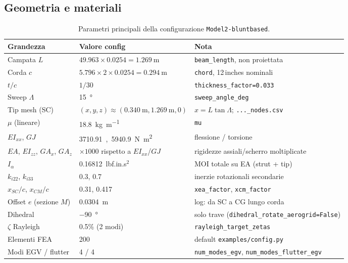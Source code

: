 \documentclass[11pt,a4paper]{article}
\begin{document}
\subsection{Geometria e materiali}

\begin{table}[H]
  \centering
  \caption{Parametri principali della configurazione \texttt{Model2-bluntbased}.}
  \label{tab:config}
  \begin{tabular}{lll}
    \toprule
    Grandezza & Valore config & Nota \\
    \midrule
    Campata $L$ & $49.963\times0.0254 = \SI{1.269}{\meter}$ & \texttt{beam\_length}, non proiettata \\
    Corda $c$ & $5.796\times2\times0.0254 = \SI{0.294}{\meter}$ & \texttt{chord}, 12\,inches nominali \\
    $t/c$ & $1/30$ & \texttt{thickness\_factor=0.033} \\
    Sweep $\Lambda$ & \SI{15}{\degree} & \texttt{sweep\_angle\_deg} \\
    Tip mesh (SC) & $(x,y,z)\approx(\SI{0.340}{\meter},\SI{1.269}{\meter},0)$ & $x=L\tan\Lambda$; \texttt{...\_nodes.csv} \\
    $\mu$ (lineare) & \SI{18.8}{\kilogram\per\meter} & \texttt{mu} \\
    $EI_{xx}$, $GJ$ & \SI{3710.91}, \SI{5940.9}{\newton\meter\squared} & flessione / torsione \\
    $EA$, $EI_{zz}$, $GA_x$, $GA_z$ & $\times 1000$ rispetto a $EI_{xx}$/$GJ$ & rigidezze assiali/scherro moltiplicate \\
    $I_\alpha$ & \SI{0.16812}{lbf.in.s$^2$} & MOI totale su EA (strut + tip) \\
    $k_{i22}$, $k_{i33}$ & 0.3, 0.7 & inerzie rotazionali secondarie \\
    $x_{SC}/c$, $x_{CM}/c$ & 0.31, 0.417 & \texttt{xea\_factor}, \texttt{xcm\_factor} \\
    Offset $e$ (sezione $M$) & \SI{0.0304}{\meter} & log: da SC a CG lungo corda \\
    Dihedral & \SI{-90}{\degree} & solo trave (\texttt{dihedral\_rotate\_aerogrid=False}) \\
    $\zeta$ Rayleigh & 0.5\% (2 modi) & \texttt{rayleigh\_target\_zetas} \\
    Elementi FEA & 200 & default \texttt{examples/config.py} \\
    Modi EGV / flutter & 4 / 4 & \texttt{num\_modes\_egv}, \texttt{num\_modes\_flutter\_egv} \\
    \bottomrule
  \end{tabular}
\end{table}
\end{document}
